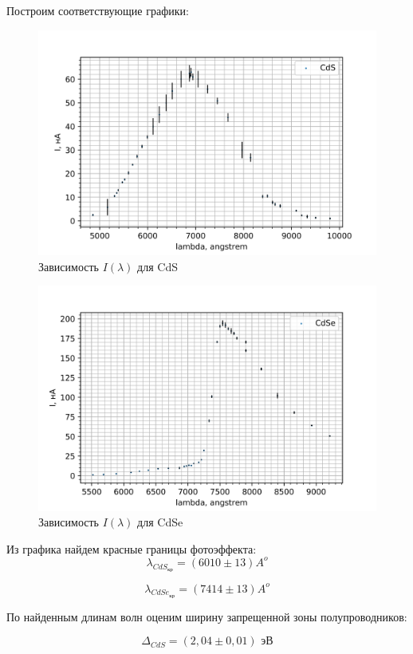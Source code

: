 \documentclass[a4paper,12pt]{report}
\begin{document}
Построим соответствующие графики:

	\begin{figure}[H]
		\centering
		\includegraphics[width=0.7\linewidth]{CdS.png}
		\caption{Зависимость $I(\lambda)$ для CdS}
	\end{figure}

 
	\begin{figure}[H]
		\centering
		\includegraphics[width=0.7\linewidth]{CdSe.png}
		\caption{Зависимость $I(\lambda)$ для CdSe}
	\end{figure}

 Из графика найдем красные границы фотоэффекта:
 \begin{equation*}
     \lambda_{CdS_{\text{кр}}} = (6010\pm 13) A^{o} 
 \end{equation*}

  \begin{equation*}
     \lambda_{CdSe_{\text{кр}}} = (7414\pm 13) A^{o} 
 \end{equation*}

По найденным длинам волн оценим ширину запрещенной зоны полупроводников:

  \begin{equation*}
     \Delta_{CdS} = (2,04 \pm 0,01) \text{ эВ} 
 \end{equation*}
\end{document}
